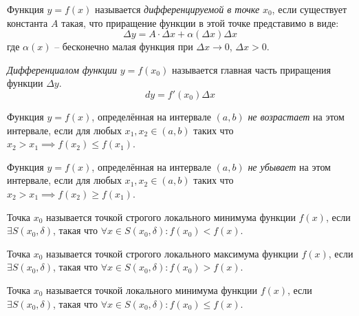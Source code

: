 \begin{definition} \label{def:64}
    Функция $y= f(x)$ называется \textit{дифференцируемой в точке} $x_0$, если существует константа $A$ такая, что приращение функции в этой точке представимо в виде: \[
        \Delta y = A \cdot \Delta x + \alpha(\Delta x) \Delta x
    \]
    где $\alpha(x)$ -- бесконечно малая функция при $\Delta x \to 0$, $\Delta x > 0$.
\end{definition}


\begin{definition} \label{def:65}
    \textit{Дифференциалом функции} $y = f(x_0)$ называется главная часть приращения функции $\Delta y$. \[
        dy = f'(x_0) \Delta x
    \] 
\end{definition}


\begin{definition} \label{def:69}
    Функция $y = f(x)$, определённая на интервале $(a, b)$ \textit{не возрастает} на этом интервале, если для любых  $x_1, x_2 \in (a, b)$ таких что $x_2 > x_1 \implies f(x_2) \le f(x_1)$.
\end{definition}


\begin{definition} \label{def:71}
    Функция $y = f(x)$, определённая на интервале $(a, b)$ \textit{не убывает} на этом интервале, если для любых  $x_1, x_2 \in (a, b)$ таких что $x_2 > x_1 \implies f(x_2) \ge f(x_1)$.
\end{definition}


\begin{definition} \label{def:74}
    Точка $x_0$ называется точкой строгого локального минимума функции $f (x)$, если $\exists S(x_0, \delta)$, такая что $\forall x \in S(x_0, \delta) : f (x_0) < f(x)$.
\end{definition}


\begin{definition} \label{def:75}
    Точка $x_0$ называется точкой строгого локального максимума функции $f (x)$, если $\exists S(x_0, \delta)$, такая что $\forall x \in S(x_0, \delta) : f (x_0) > f(x)$.
\end{definition}


\begin{definition} \label{def:76}
    Точка $x_0$ называется точкой локального минимума функции $f (x)$, если $\exists S(x_0, \delta)$, такая что $\forall x \in S(x_0, \delta) : f (x_0) \le f(x)$.
\end{definition}


